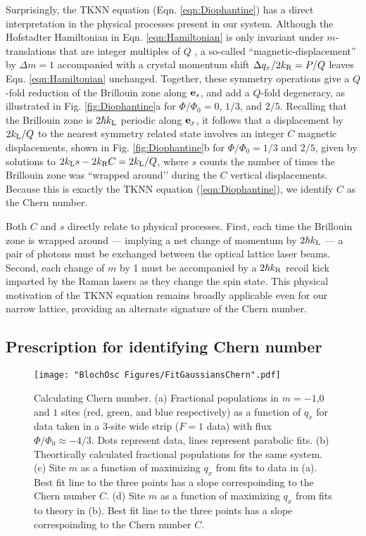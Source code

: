 Surprisingly, the TKNN equation (Eqn. \ref{eqn:Diophantine}) has a direct interpretation in the physical processes present in our system.  Although the Hofstadter Hamiltonian in Eqn. \ref{eqn:Hamiltonian} is only invariant under $m$-translations that are integer multiples of $Q$ , a so-called ``magnetic-displacement'' by $\Delta m=1$ accompanied with a crystal momentum shift $\Delta q_x/2 k_{\rm R} = P/Q$ leaves Eqn. \ref{eqn:Hamiltonian} unchanged.  Together, these symmetry operations give a $Q$-fold reduction of the Brillouin zone along ${\bf e}_s$, and add a $Q$-fold degeneracy, as illustrated in Fig. \ref{fig:Diophantine}a  for $\Phi/\Phi_0=0$, $1/3$, and $2/5$.  Recalling that the Brillouin zone is $2 \hbar k_{\rm L}$ periodic along ${\bf e}_x$, it follows that a displacement by $2 k_{\rm L}/Q$ to the nearest symmetry related state involves an integer $C$ magnetic displacements, shown in Fig. \ref{fig:Diophantine}b for $\Phi/\Phi_0=1/3$ and $2/5$, given by solutions to $2  k_{\rm L} s - 2  k_{\rm R} C = 2  k_{\rm L}/Q$, where $s$ counts the number of times the Brillouin zone was ``wrapped around’’ during the $C$ vertical displacements. Because this is exactly the TKNN equation (\ref{eqn:Diophantine}), we identify $C$ as the Chern number. 

Both $C$ and $s$ directly relate to physical processes.  First, each time the  Brillouin zone is wrapped around — implying a net change of momentum by $2 \hbar k_{\rm L}$ — a pair of photons must be exchanged between the optical lattice laser beams.  Second, each change of $m$ by 1 must be accompanied by a $2 \hbar k_{\rm R}$ recoil kick imparted by the Raman lasers as they change the spin state.  This physical motivation of the TKNN equation remains broadly applicable even for our narrow lattice, providing an alternate signature of the Chern number.

\subsection{Prescription for identifying Chern number}

\begin{figure}
\texttt{[image: "BlochOsc Figures/FitGaussiansChern".pdf]}
\caption[Calculating Chern number]{Calculating Chern number. (a) Fractional populations in $m=-1$,$0$ and $1$ sites (red, green, and blue respectively) as a function of $q_x$ for data taken in a $3$-site wide strip ($F=1$ data) with flux $\Phi/\Phi_0\approx-4/3$. Dots represent data, lines represent parabolic fits. (b) Theortically calculated fractional populations for the same system. (c) Site $m$ as a function of maximizing $q_x$ from fits to data in (a). Best fit line to the three points has a slope correspoinding to the Chern number $C$. (d) Site $m$ as a function of maximizing $q_x$ from fits to theory in (b). Best fit line to the three points has a slope correspoinding to the Chern number $C$.  }
\label{fig:FitGaussiansChern}
\end{figure}

